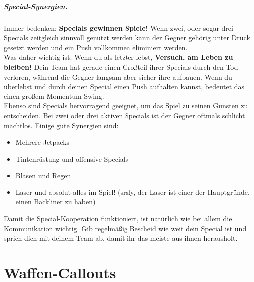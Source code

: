 \documentclass{scrreprt}
\begin{document}
\paragraph{Special-Synergien.} Immer bedenken: \textbf{Specials gewinnen Spiele!} Wenn zwei, oder sogar drei Specials zeitgleich sinnvoll genutzt werden kann der Gegner gehörig unter Druck gesetzt werden und ein Push vollkommen eliminiert werden. \\
Was daher wichtig ist: Wenn du als letzter lebst, \textbf{Versuch, am Leben zu bleiben!} Dein Team hat gerade einen Großteil ihrer Specials durch den Tod verloren, während die Gegner langsam aber sicher ihre aufbauen. Wenn du überlebst und durch deinen Special einen Push aufhalten kannst, bedeutet das einen großem Momentum Swing. \\
Ebenso sind Specials hervorragend geeignet, um das Spiel zu seinen Gunsten zu entscheiden. Bei zwei oder drei aktiven Specials ist der Gegner oftmals schlicht machtlos. Einige gute Synergien sind: 
\begin{itemize}
	\item Mehrere Jetpacks
	\item Tintenrüstung und offensive Specials
	\item Blasen und Regen
	\item Laser und absolut alles im Spiel! (srsly, der Laser ist einer der Hauptgründe, einen Backliner zu haben)
\end{itemize}
Damit die Special-Kooperation funktioniert, ist natürlich wie bei allem die Kommunikation wichtig. Gib regelmäßig Bescheid wie weit dein Special ist und sprich dich mit deinem Team ab, damit ihr das meiste aus ihnen herausholt.
\chapter{Waffen-Callouts}
\end{document}
